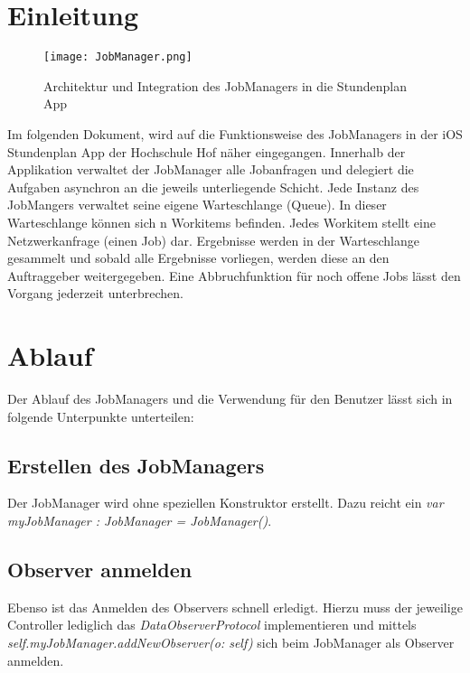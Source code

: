 \documentclass[a4paper, 12pt]{article}
\begin{document}
\section{Einleitung}
\begin{figure}
	\centering
	\texttt{[image: JobManager.png]}
	\caption{Architektur und Integration des JobManagers in die Stundenplan App}
	\label{img:JobManager-Architektur}
\end{figure}
Im folgenden Dokument, wird auf die Funktionsweise des JobManagers in der iOS Stundenplan App der Hochschule Hof näher eingegangen.
\newline Innerhalb der Applikation verwaltet der JobManager alle Jobanfragen und delegiert die Aufgaben asynchron an die jeweils unterliegende Schicht.
\newline
\newline Jede Instanz des JobMangers verwaltet seine eigene Warteschlange (Queue). In dieser Warteschlange können sich n Workitems befinden. Jedes Workitem stellt eine Netzwerkanfrage (einen Job) dar. Ergebnisse werden in der Warteschlange gesammelt und sobald alle Ergebnisse vorliegen, werden diese an den Auftraggeber weitergegeben.
\newline
Eine Abbruchfunktion für noch offene Jobs lässt den Vorgang jederzeit unterbrechen.
\newpage
\section{Ablauf}
Der Ablauf des JobManagers und die Verwendung für den Benutzer lässt sich in folgende Unterpunkte unterteilen:
\newline
\subsection{Erstellen des JobManagers}
Der JobManager wird ohne speziellen Konstruktor erstellt. Dazu reicht ein 
\newline  \textit{var myJobManager : JobManager = JobManager()}.

\subsection{Observer anmelden}
Ebenso ist das Anmelden des Observers schnell erledigt. Hierzu muss der jeweilige Controller lediglich das \textit{DataObserverProtocol}  implementieren und mittels
\newline
\newline
\textit{self.myJobManager.addNewObserver(o: self)}
\newline
\newline sich beim JobManager als Observer anmelden.
\end{document}
